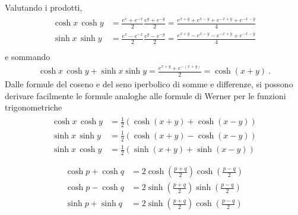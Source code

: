 \documentclass[letterpaper,10pt,italian]{jupyterBook}
\begin{document}
\sphinxAtStartPar
Valutando i prodotti,
\begin{equation*}
\begin{split}\begin{aligned}
 \cosh x \, \cosh y & = \frac{e^x + e^{-x}}{2} \frac{e^y + e^{-y}}{2} = \frac{e^{x+y} + e^{x-y} + e^{-x+y} + e^{-x-y}}{4} \\
 \sinh x \, \sinh y & = \frac{e^x - e^{-x}}{2} \frac{e^y - e^{-y}}{2} = \frac{e^{x+y} - e^{x-y} - e^{-x+y} + e^{-x-y}}{4} \\ 
\end{aligned}\end{split}
\end{equation*}
\sphinxAtStartPar
e sommando
\begin{equation*}
\begin{split}\cosh x \, \cosh y + \sinh x \sinh y = \frac{e^{x+y} + e^{-(x+y)}}{2} = \cosh(x+y) \ .\end{split}
\end{equation*}
\sphinxAtStartPar
{}
Dalle formule del coseno e del seno iperbolico di somme e differenze, si possono derivare facilmente le formule analoghe alle formule di Werner per le funzioni trigonometriche
\begin{equation*}
\begin{split}\begin{aligned}
  \cosh x \, \cosh y & = \frac{1}{2} \left( \cosh(x+y) + \cosh(x-y) \right) \\
  \sinh x \, \sinh y & = \frac{1}{2} \left( \cosh(x+y) - \cosh(x-y) \right) \\
  \sinh x \, \cosh y & = \frac{1}{2} \left( \sinh(x+y) + \sinh(x-y) \right) \\
\end{aligned}\end{split}
\end{equation*}
\sphinxAtStartPar
{}
\begin{equation*}
\begin{split}\begin{aligned}
  \cosh p + \cosh q & = 2 \cosh \left( \frac{p+q}{2} \right) \cosh \left( \frac{p-q}{2} \right) \\
  \cosh p - \cosh q & = 2 \sinh \left( \frac{p+q}{2} \right) \sinh \left( \frac{p-q}{2} \right) \\
  \sinh p + \sinh q & = 2 \sinh \left( \frac{p+q}{2} \right) \cosh \left( \frac{p-q}{2} \right) \\
\end{aligned}\end{split}
\end{equation*}
\end{document}
